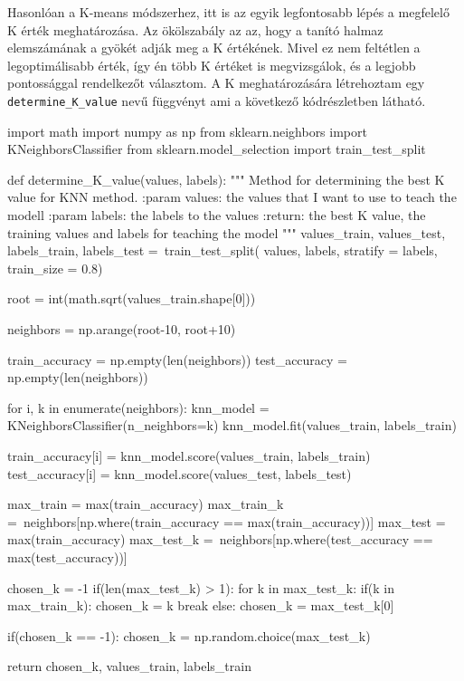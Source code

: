 Hasonlóan a K-means módszerhez, itt is az egyik legfontosabb lépés a megfelelő K érték meghatározása. Az ökölszabály az az, hogy a tanító halmaz elemszámának a gyökét adják meg a K értékének. Mivel ez nem feltétlen a legoptimálisabb érték, így én több K értéket is megvizsgálok, és a legjobb pontossággal rendelkezőt választom. A K meghatározására létrehoztam egy \texttt{determine\_K\_value} nevű függvényt ami a következő kódrészletben látható.
\begin{python}
import math
import numpy as np
from sklearn.neighbors import KNeighborsClassifier
from sklearn.model_selection import train_test_split

def determine_K_value(values, labels):
    """
    Method for determining the best K value for KNN method.
    :param values: the values that I want to use to teach the modell
    :param labels: the labels to the values
    :return: the best K value, the training values and labels
        for teaching the model
    """
    values_train, values_test, labels_train, labels_test =\
        train_test_split(
            values,
            labels,
            stratify = labels,
            train_size = 0.8)

    root =  int(math.sqrt(values_train.shape[0]))

    neighbors = np.arange(root-10, root+10)

    train_accuracy = np.empty(len(neighbors))
    test_accuracy = np.empty(len(neighbors))

    for i, k in enumerate(neighbors):
        knn_model = KNeighborsClassifier(n_neighbors=k)
        knn_model.fit(values_train, labels_train)

        train_accuracy[i] = knn_model.score(values_train, labels_train)
        test_accuracy[i] = knn_model.score(values_test, labels_test)

    max_train = max(train_accuracy)
    max_train_k =\
        neighbors[np.where(train_accuracy == max(train_accuracy))]
    max_test = max(train_accuracy)
    max_test_k =\
        neighbors[np.where(test_accuracy == max(test_accuracy))]

    chosen_k = -1
    if(len(max_test_k) > 1):
        for k in max_test_k:
            if(k in max_train_k):
                chosen_k = k
                break
    else:
        chosen_k = max_test_k[0]

    if(chosen_k == -1):
        chosen_k = np.random.choice(max_test_k)

    return chosen_k, values_train, labels_train
\end{python}

